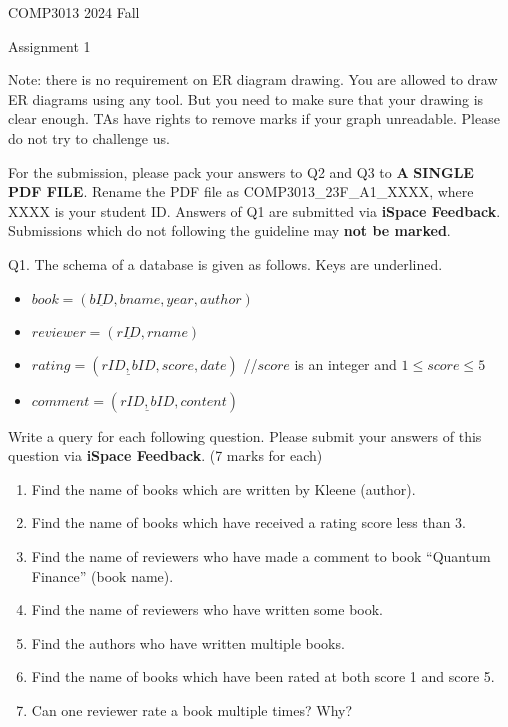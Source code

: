 \documentclass[
]{article}
\author{}
\date{}
\begin{document}
COMP3013 2024 Fall

Assignment 1

Note: there is no requirement on ER diagram drawing. You are allowed to
draw ER diagrams using any tool. But you need to make sure that your
drawing is clear enough. TAs have rights to remove marks if your graph
unreadable. Please do not try to challenge us.

For the submission, please pack your answers to Q2 and Q3 to \textbf{A}
\textbf{SINGLE PDF FILE}. Rename the PDF file as
COMP3013\_23F\_A1\_XXXX, where XXXX is your student ID. Answers of Q1
are submitted via \textbf{iSpace Feedback}. Submissions which do not
following the guideline may \textbf{not be marked}.

Q1. The schema of a database is given as follows. Keys are underlined.

\begin{itemize}
\item
  \(book = (\underline{bID},bname,year,author)\)
\item
  \(reviewer = (\underline{rID},rname)\)
\item
  \(rating = (\underline{rID,bID},score,date)\) //\(score\) is an
  integer and \(1 \leq score \leq 5\)
\item
  \(comment = (\underline{rID,bID},content)\)
\end{itemize}

Write a query for each following question. Please submit your answers of
this question via \textbf{iSpace Feedback}. (7 marks for each)

\begin{enumerate}
\def\labelenumi{\alph{enumi})}
\item
  Find the name of books which are written by Kleene (author).
\item
  Find the name of books which have received a rating score less than 3.
\item
  Find the name of reviewers who have made a comment to book ``Quantum
  Finance'' (book name).
\item
  Find the name of reviewers who have written some book.
\item
  Find the authors who have written multiple books.
\item
  Find the name of books which have been rated at both score 1 and score
  5.
\item
  Can one reviewer rate a book multiple times? Why?
\end{enumerate}
\end{document}
